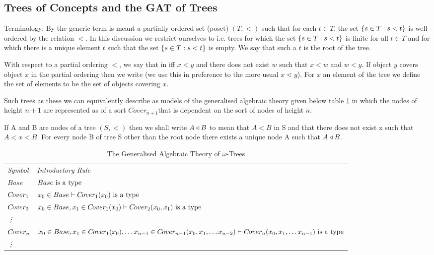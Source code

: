 \subsection {Trees of Concepts and the GAT of Trees}

\note 
Terminology: By  the generic term  is meant a partially ordered set (poset) $(T, <)$ such that for each $t \in T$, the set $\left\{s \in T : s < t\right\}$ is well-ordered by the relation $<$.
In this discussion we restrict ourselves to  i.e. trees for which the set $\left\{s \in T : s < t\right\}$
is finite for all $t \in T$ and for which there is a unique element $t$ such that
 the set $\left\{s \in T : s < t\right\}$ is empty. We say that such a $t$ is the root of the tree.

With respect to a partial ordering $<$, we say that  in  iff $x<y$ and there does not exist $w$ such that $x < w$ and $w < y$.
If object $y$ covers object $x$ in the partial ordering 
then we write  (we use this in preference to the more usual $x \lessdot y$).
For $x$ an element of the tree we define the set of elements   to be the set of objects covering $x$.


Such trees as these we can equivalently describe as models of the generalised algebraic theory given below table \ref{GATOFTREES} in which the nodes of height $n+1$ are represented as of a sort $Cover_{n+1}$that is dependent on the sort of nodes of height $n$.

\newcommand{\Ft}[1]{\downarrow \kern -0.325em #1}
If A and B are nodes of  a tree $(S,<)$ then we shall write $A \triangleleft B$ to mean that $A < B$ in S and that
there does not exist x such that $A < x < B$. For every node B of tree S other than the root node there exists a unique node A such that $A \triangleleft B$.

\newcommand{\Sz}{Base}
\newcommand{\ofS}[1]{\ofT{#1}{\Sz}}
\newcommand{\Si}[1]{C\kern-1pt over_{#1}}
\newcommand{\ofSi}[3]{\ofT{#1}{\Si{#2}(#3)}}
\vspace{0.03cm} 
\begin{table}[H]
\caption{The Generalised Algebraic Theory of $\omega$-Trees}
\label{GATOFTREES}
\begin{tabular}{>{\itshape}l l}
Symbol & \itshape{Introductory Rule} \\
$\Sz  $&$\isT{\Sz}$\\
$\Si{1} $&$\ofS{x_0} \tstyle \isT{\Si{1}(x_0)} $\\
$\Si{2} $&$\ofS{x_0},\ofSi{x_1}{1}{x_0} \tstyle \isT{\Si{2}(x_0,x_1)} $\\
\vdots  \\
$\Si{n} $&$\ofS{x_0},\ofSi{x_1}{1}{x_0}, \hdots \ofSi{x_{n-1}}{n-1}{x_0,x_1,\hdots x_{n-2}} \tstyle \isT{\Si{n}(x_0,x_1,\hdots x_{n-1})} $\\
\vdots   \\
\end{tabular} \\
\end{table} 


